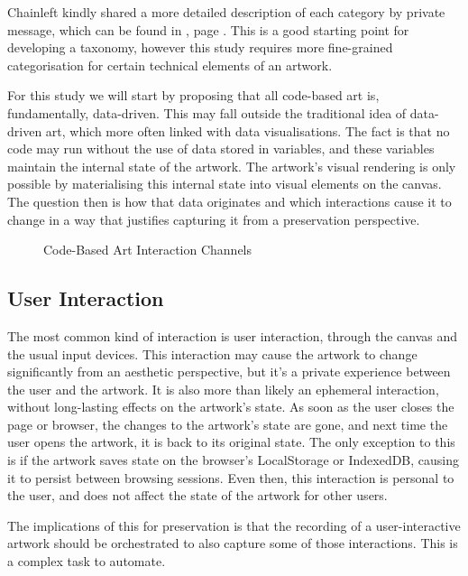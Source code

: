 Chainleft kindly shared a more detailed description of each category by private message, which can be found in , page \pageref{appx:chainleft-taxonomy}. This is a good starting point for developing a taxonomy, however this study requires more fine-grained categorisation for certain technical elements of an artwork. 

For this study we will start by proposing that all code-based art is, fundamentally, data-driven. This may fall outside the traditional idea of data-driven art, which more often linked with data visualisations. The fact is that no code may run without the use of data stored in variables, and these variables maintain the internal state of the artwork. The artwork's visual rendering is only possible by materialising this internal state into visual elements on the canvas. The question then is how that data originates and which interactions cause it to change in a way that justifies capturing it from a preservation perspective.


\begin{figure}[h]
    \centering
    \captionsetup{justification=centering}
    
    \caption[Code-Based Art Interaction Channels]{Code-Based Art Interaction Channels}
    \label{fig:code-based-art-interactions}
\end{figure}

\subsection{User Interaction}

The most common kind of interaction is user interaction, through the canvas and the usual input devices. This interaction may cause the artwork to change significantly from an aesthetic perspective, but it's a private experience between the user and the artwork. It is also more than likely an ephemeral interaction, without long-lasting effects on the artwork's state. As soon as the user closes the page or browser, the changes to the artwork's state are gone, and next time the user opens the artwork, it is back to its original state. The only exception to this is if the artwork saves state on the browser's LocalStorage or IndexedDB, causing it to persist between browsing sessions. Even then, this interaction is personal to the user, and does not affect the state of the artwork for other users.

The implications of this for preservation is that the recording of a user-interactive artwork should be orchestrated to also capture some of those interactions. This is a complex task to automate.


